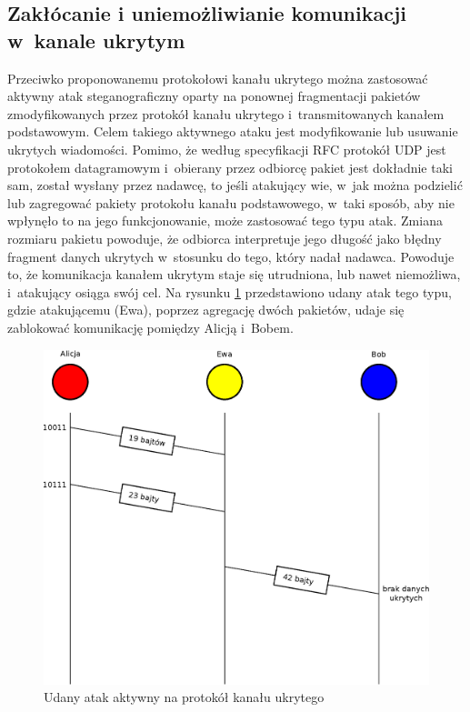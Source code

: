 \documentclass[a4paper, twoside, openright, 12pt]{report}
\begin{document}
       \subsection{Zakłócanie i uniemożliwianie komunikacji w~kanale ukrytym}
       Przeciwko proponowanemu protokołowi kanału ukrytego można zastosować aktywny atak steganograficzny
       oparty na ponownej fragmentacji pakietów zmodyfikowanych przez protokół
       kanału ukrytego i~transmitowanych kanałem podstawowym. Celem takiego aktywnego
       ataku jest modyfikowanie lub usuwanie ukrytych wiadomości. Pomimo, że według
       specyfikacji RFC protokół UDP jest protokołem datagramowym i~obierany przez
       odbiorcę pakiet jest dokładnie taki sam, został wysłany przez
       nadawcę, to jeśli atakujący wie, w~jak można podzielić lub zagregować
       pakiety protokołu kanału podstawowego, w~taki sposób, aby nie wpłynęło to na
       jego funkcjonowanie, może zastosować tego typu atak. Zmiana rozmiaru pakietu
       powoduje, że odbiorca interpretuje jego długość jako błędny fragment danych
       ukrytych w~stosunku do tego, który nadał nadawca. Powoduje to, że komunikacja
       kanałem ukrytym staje się utrudniona, lub nawet niemożliwa, i~atakujący osiąga
       swój cel. Na rysunku \ref{UDANYATAKAKTYWNY} przedstawiono udany atak tego typu,
       gdzie atakującemu (Ewa), poprzez agregację dwóch pakietów,
       udaje się zablokować komunikację pomiędzy Alicją i~Bobem.
        \begin{figure}[h]
                \centering
                \includegraphics[scale=0.7]{udany_atak}
                \caption{Udany atak aktywny na protokół kanału ukrytego}
                \label{UDANYATAKAKTYWNY}
        \end{figure}
\end{document}
